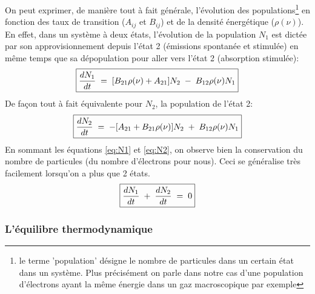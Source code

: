 On peut exprimer, de manière tout à fait générale, l'évolution des populations\footnote{le terme 'population' désigne le nombre de particules dans un certain état dans un système. Plus précisément on parle dans notre cas d'une population d'électrons ayant la même énergie dans un gaz macroscopique par exemple} en fonction des taux de transition ($A_{ij}$ et $B_{ij}$) et de la densité énergétique ($\rho(\nu)$).\\
En effet, dans un système à deux états, l'évolution de la population $N_1$ est dictée par son approvisionnement depuis l'état 2 (émissions spontanée et stimulée) en même temps que sa dépopulation pour aller vers l'état 2 (absorption stimulée):
\begin{equation}
\boxed{
    \dfrac{dN_1}{dt}
    \; = \;  [B_{21}\rho(\nu) + A_{21}]N_2 \;-\; B_{12} \rho(\nu)N_1
    }
    \label{eq:N2}
\end{equation}
De façon tout à fait équivalente pour $N_2$, la population de l'état 2:
\begin{equation}
\boxed{
    \dfrac{dN_2}{dt}
    \; = \; - [A_{21} + B_{21} \rho(\nu)]N_2 \;+\; B_{12}\rho(\nu)N_1 
    \label{eq:N1}
    }
\end{equation}
En sommant les équations \ref{eq:N1} et \ref{eq:N2}, on observe bien la conservation du nombre de particules (du nombre d'électrons pour nous). Ceci se généralise très facilement lorsqu'on a plus que 2 états.
\begin{equation}
\boxed{
    \dfrac{dN_1}{dt}\;+\;\dfrac{dN_2}{dt} \; = \; 0
    }
\end{equation}



\subsubsection{L'équilibre thermodynamique}




